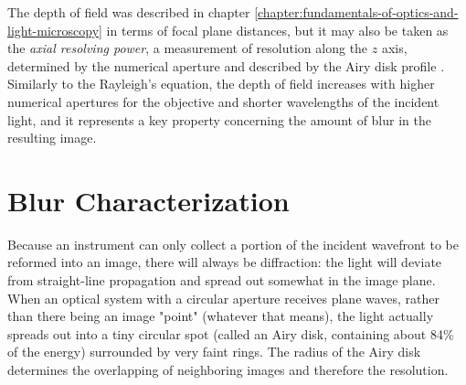 The depth of field was described in chapter \ref{chapter:fundamentals-of-optics-and-light-microscopy} in terms of focal plane distances, but it may also be taken as the \emph{axial resolving power}, a measurement of resolution along the $z$ axis, determined by the numerical aperture and described by the Airy disk profile \cite{davidson2002optical}. Similarly to the Rayleigh's equation, the depth of field increases
with higher numerical apertures for the objective and shorter wavelengths of the incident light, and it represents a key property concerning the amount of blur in the resulting image.




\section{Blur Characterization}

Because an instrument can only collect a portion of the
incident wavefront to be reformed into an image, there will
always be diffraction: the light will deviate from straight-line
propagation and spread out somewhat in the image plane.
When an optical system with a circular aperture receives plane waves, rather than there being an image "point" (whatever that
means), the light actually spreads out into a tiny circular spot
(called an Airy disk, containing about 84\% of the energy) 
surrounded by very faint rings. The radius of the Airy disk 
determines the overlapping of neighboring images and therefore the
resolution.


